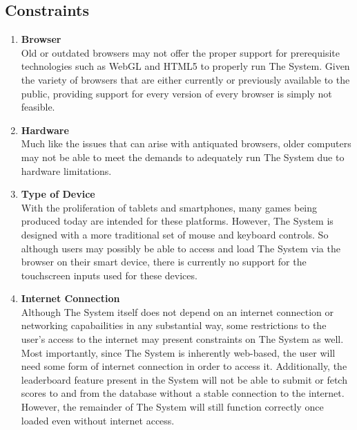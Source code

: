 \documentclass[12pt]{report}
\newenvironment{reqlist}{
	\renewcommand{\labelenumi}{\tab\thesubsection.\arabic{enumi}}
	\renewcommand{\labelenumii}{\thesubsection.\arabic{enumi}.\arabic{enumii}}
	\begin{enumerate}[itemsep = 1pt, parsep = 0pt, leftmargin = *]
}{\end{enumerate}}
\begin{document}
	\subsection{Constraints}
		\begin{reqlist}
			\item \textbf{Browser} \\
				Old or outdated browsers may not offer the proper support for prerequisite technologies such as WebGL and HTML5 to properly run The System. Given the variety of browsers that are either currently or previously available to the public, providing support for every version of every browser is simply not feasible.
			\item \textbf{Hardware} \\
				Much like the issues that can arise with antiquated browsers, older computers may not be able to meet the demands to adequately run The System due to hardware limitations.
			\item \textbf{Type of Device} \\
				With the proliferation of tablets and smartphones, many games being produced today are intended for these platforms. However, The System is designed with a more traditional set of mouse and keyboard controls. So although users may possibly be able to access and load The System via the browser on their smart device, there is currently no support for the touchscreen inputs used for these devices.
			\item \textbf{Internet Connection} \\
				Although The System itself does not depend on an internet connection or networking capabailities in any substantial way, some restrictions to the user's access to the internet may present constraints on The System as well. Most importantly, since The System is inherently web-based, the user will need some form of internet connection in order to access it. Additionally, the leaderboard feature present in the System will not be  able to submit or fetch scores to and from the database without a stable connection to the internet. However, the remainder of The System will still function correctly once loaded even without internet access.
		\end{reqlist}
\end{document}

